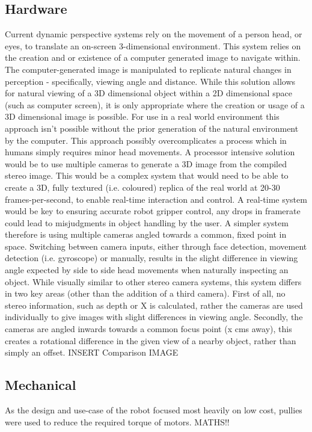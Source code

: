 \documentclass[11pt]{article} %
\begin{document}
\subsection{Hardware}
Current dynamic perspective systems rely on the movement of a person head, or eyes, to translate an on-screen 3-dimensional environment. This system relies on the creation and or existence of a computer generated image to navigate within. The computer-generated image is manipulated to replicate natural changes in perception -  specifically, viewing angle and distance. 
While this solution allows for natural viewing of a 3D dimensional object within a 2D dimensional space (such as computer screen), it is only appropriate where the creation or usage of a 3D dimensional image is possible. For use in a real world environment this approach isn’t possible without the prior generation of the natural environment by the computer. This approach possibly overcomplicates a process which in humans simply requires minor head movements.
A processor intensive solution would be to use multiple cameras to generate a 3D image from the compiled stereo image. This would be a complex system that would need to be able to create a 3D, fully textured (i.e. coloured) replica of the real world at 20-30 frames-per-second, to enable real-time interaction and control. A real-time system would be key to ensuring accurate robot gripper control, any drops in framerate could lead to misjudgments in object handling by the user. A simpler system therefore is using multiple cameras angled towards a common, fixed point in space. Switching between camera inputs, either through face detection, movement detection (i.e. gyroscope) or manually, results in the slight difference in viewing angle expected by side to side head movements when naturally inspecting an object.
While visually similar to other stereo camera systems, this system differs in two key areas (other than the addition of a third camera). First of all, no stereo information, such as depth or X is calculated, rather the cameras are used individually to give images with slight differences in viewing angle. Secondly, the cameras are angled inwards towards a common focus point (x cms away), this creates a rotational difference in the given view of a nearby object, rather than simply an offset.
INSERT Comparison IMAGE

\subsection{Mechanical}
As the design and use-case of the robot focused most heavily on low cost, pullies were used to reduce the required torque of motors.
MATHS!!
\end{document}
